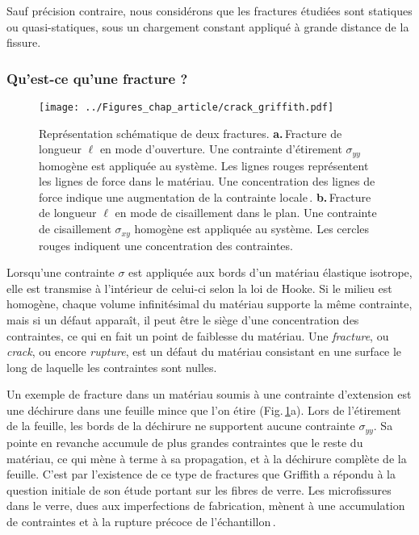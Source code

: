 Sauf précision contraire, nous considérons que les fractures étudiées sont statiques ou quasi-statiques, sous un chargement constant appliqué à grande distance de la fissure.


\subsubsection{Qu'est-ce qu'une fracture ?}
\begin{figure}[htb]
\centering
\texttt{[image: ../Figures\_chap\_article/crack\_griffith.pdf]}
\caption[Concentration des contraintes en pointe de fissure]{Représentation schématique de deux fractures. \textbf{a.}\,Fracture de longueur $\ell$ en mode d'ouverture. Une contrainte d'étirement $\sigma_{yy}$ homogène est appliquée au système. Les lignes rouges représentent les lignes de force dans le matériau. Une concentration des lignes de force indique une augmentation de la contrainte locale\,\cite{ohring_engineering_1995}. \textbf{b.}\,Fracture de longueur $\ell$ en mode de cisaillement dans le plan. Une contrainte de cisaillement $\sigma_{xy}$ homogène est appliquée au système. Les cercles rouges indiquent une concentration des contraintes.}
\label{fig:griffith_intro}
\end{figure}




Lorsqu'une contrainte $\sigma$ est appliquée aux bords d'un matériau élastique isotrope, elle est transmise à l'intérieur de celui-ci selon la loi de Hooke. Si le milieu est homogène, chaque volume infinitésimal du matériau supporte la même contrainte, mais si un défaut apparaît, il peut être le siège d'une concentration des contraintes, ce qui en fait un point de faiblesse du matériau. Une \textit{fracture}, ou \textit{crack}, ou encore \textit{rupture}, est un défaut du matériau consistant en une surface le long de laquelle les contraintes sont nulles.

Un exemple de fracture dans un matériau soumis à une contrainte d'extension est une déchirure dans une feuille mince que l'on étire (Fig.\,\ref{fig:griffith_intro}a). Lors de l'étirement de la feuille, les bords de la déchirure ne supportent aucune contrainte $\sigma_{yy}$. Sa pointe en revanche accumule de plus grandes contraintes que le reste du matériau, ce qui mène à terme à sa propagation, et à la déchirure complète de la feuille. C'est par l'existence de ce type de fractures que Griffith a répondu à la question initiale de son étude portant sur les fibres de verre. Les microfissures dans le verre, dues aux imperfections de fabrication, mènent à une accumulation de contraintes et à la rupture précoce de l'échantillon\,\cite{griffith_phenomena_1921}.












